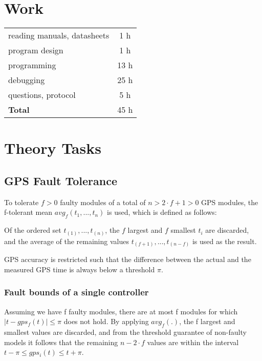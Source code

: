 \documentclass[12pt,a4paper,titlepage,oneside]{article}
\begin{document}
\section{Work}

\begin{tabular}{|l|c|}
\hline
reading manuals, datasheets	& 1 h	\\
program design			& 1 h	\\
programming			& 13 h	\\
debugging			& 25 h	\\
questions, protocol		& 5 h	\\
\hline
{\bf Total}			& 45 h	\\
\hline
\end{tabular}

\section{Theory Tasks}

\subsection{GPS Fault Tolerance}

To tolerate $f > 0$ faulty modules of a total of $n > 2 \cdot f + 1 >
0$ GPS modules, the f-tolerant mean $avg_f(t_1, ... , t_n)$ is used, which is
defined as follows:

Of the ordered set $t_{(1)}, ... , t_{(n)}$, the $f$ largest and $f$ smallest
$t_i$ are discarded, and the average of the remaining values $t_{(f + 1)}, ...,
t_{(n - f)}$ is used as the result.

GPS accuracy is restricted such that the difference between the actual and the
measured GPS time is always below a threshold $\pi$.

\subsubsection{Fault bounds of a single controller}

Assuming we have f faulty modules, there are at most f modules for which
$|t-gps_f(t)| \leq \pi$ does not hold. By applying $avg_f(.)$, the f largest and
smallest values are discarded, and from the threshold guarantee of non-faulty
models it follows that the remaining $n - 2 \cdot f$ values are within the
interval $t - \pi \leq gps_i(t) \leq t + \pi$.
\end{document}
